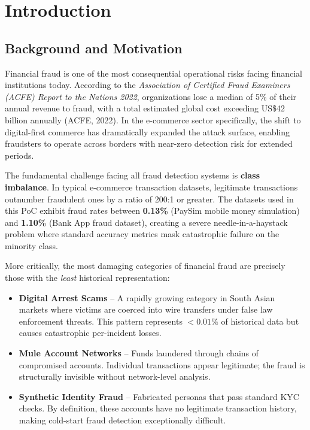 \documentclass[12pt,a4paper,oneside]{book}
\begin{document}
\newpage
\tableofcontents
\thispagestyle{empty}
\newpage

\listoffigures
{}
\newpage

\listoftables
{}
\newpage

\chapter{Introduction}
\thispagestyle{fancy}

\section{Background and Motivation}

Financial fraud is one of the most consequential operational risks facing financial institutions today. According to the \textit{Association of Certified Fraud Examiners (ACFE) Report to the Nations 2022}, organizations lose a median of 5\% of their annual revenue to fraud, with a total estimated global cost exceeding US\$42 billion annually (ACFE, 2022). In the e-commerce sector specifically, the shift to digital-first commerce has dramatically expanded the attack surface, enabling fraudsters to operate across borders with near-zero detection risk for extended periods.

The fundamental challenge facing all fraud detection systems is \textbf{class imbalance}. In typical e-commerce transaction datasets, legitimate transactions outnumber fraudulent ones by a ratio of 200:1 or greater. The datasets used in this PoC exhibit fraud rates between \textbf{0.13\%} (PaySim mobile money simulation) and \textbf{1.10\%} (Bank App fraud dataset), creating a severe needle-in-a-haystack problem where standard accuracy metrics mask catastrophic failure on the minority class.

More critically, the most damaging categories of financial fraud are precisely those with the \emph{least} historical representation:

\begin{itemize}
    \item \textbf{Digital Arrest Scams} -- A rapidly growing category in South Asian markets where victims are coerced into wire transfers under false law enforcement threats. This pattern represents $<0.01\%$ of historical data but causes catastrophic per-incident losses.
    \item \textbf{Mule Account Networks} -- Funds laundered through chains of compromised accounts. Individual transactions appear legitimate; the fraud is structurally invisible without network-level analysis.
    \item \textbf{Synthetic Identity Fraud} -- Fabricated personas that pass standard KYC checks. By definition, these accounts have no legitimate transaction history, making cold-start fraud detection exceptionally difficult.
\end{itemize}
\end{document}
